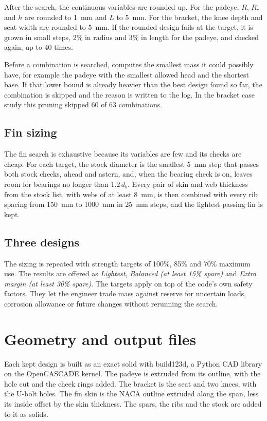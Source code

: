 After the search, the continuous variables are rounded up. For the padeye,
$R$, $R_c$ and $h$ are rounded to 1~mm and $L$ to 5~mm. For the bracket, the
knee depth and seat width are rounded to 5~mm. If the rounded design fails at
the target, it is grown in small steps, 2\% in radius and 3\% in length for
the padeye, and checked again, up to 40 times.

Before a combination is searched, \NEMO{} computes the smallest mass it could
possibly have, for example the padeye with the smallest allowed head and the
shortest base. If that lower bound is already heavier than the best design
found so far, the combination is skipped and the reason is written to the
log. In the bracket case study this pruning skipped 60 of 63 combinations.

\subsection{Fin sizing}

The fin search is exhaustive because its variables are few and its checks
are cheap. For each target, the stock diameter is the smallest 5~mm step that
passes both stock checks, ahead and astern, and, when the bearing check is on,
leaves room for bearings no longer than $1.2\,d_b$. Every pair of skin and web thickness from the stock
list, with webs of at least 8~mm, is then combined with every rib spacing from
150~mm to 1000~mm in 25~mm steps, and the lightest passing fin is kept.

\subsection{Three designs}

The sizing is repeated with strength targets of 100\%, 85\% and 70\% maximum
use. The results are offered as \emph{Lightest}, \emph{Balanced (at least 15\%
spare)} and \emph{Extra margin (at least 30\% spare)}. The targets apply on top
of the code's own safety factors. They let the engineer trade mass against
reserve for uncertain loads, corrosion allowance or future changes without
rerunning the search.

\section{Geometry and output files}
\label{sec:cad}

Each kept design is built as an exact solid with build123d, a Python CAD
library on the OpenCASCADE kernel. The padeye is extruded from its outline,
with the hole cut and the cheek rings added. The bracket is the seat and two
knees, with the U-bolt holes. The fin skin is the NACA outline extruded along
the span, less its inside offset by the skin thickness. The spars, the ribs
and the stock are added to it as solids.

